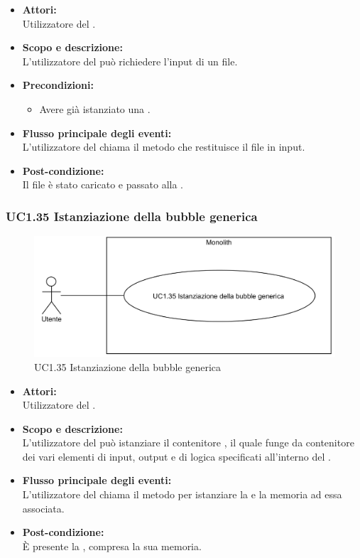 \begin{itemize}
	\item \textbf{Attori:}
	\\Utilizzatore del .
	\item \textbf{Scopo e descrizione:} 
	\\L'utilizzatore del  può richiedere l'input di un file.
	\item \textbf{Precondizioni:}
	\begin{itemize}
		\item Avere già istanziato una .
	\end{itemize}
	\item \textbf{Flusso principale degli eventi:}
	\\L'utilizzatore del  chiama il metodo che restituisce il file in input.
	\item \textbf{Post-condizione:}
	\\Il file è stato caricato e passato alla .
\end{itemize}

\subsubsection{UC1.35 Istanziazione della bubble generica} \label{UC1.35}

\begin{figure}[H]
	\centering
	\includegraphics[width=15cm]{../../documenti/AnalisiDeiRequisiti/Diagrammi_img/uc1_35.png}
	\caption{UC1.35 Istanziazione della bubble generica}
\end{figure}

\begin{itemize}
	\item \textbf{Attori:}
	\\Utilizzatore del .
	\item \textbf{Scopo e descrizione:} 
	\\L'utilizzatore del  può istanziare il contenitore , il quale funge da contenitore dei vari elementi di input, output e di logica specificati all'interno del .
	\item \textbf{Flusso principale degli eventi:}
	\\L'utilizzatore del  chiama il metodo per istanziare la  e la memoria ad essa associata.
	\item \textbf{Post-condizione:}
	\\È presente la , compresa la sua memoria.
\end{itemize}

